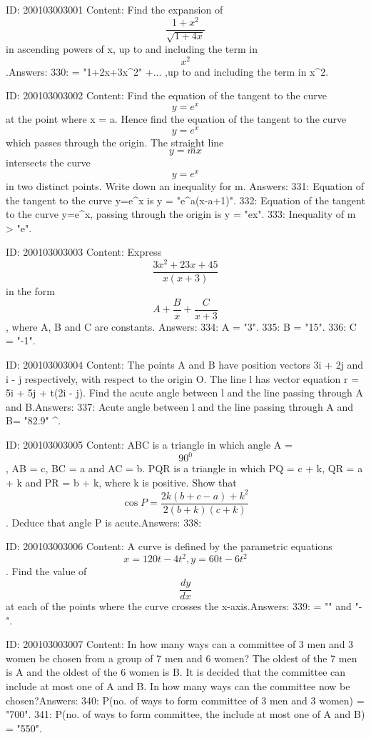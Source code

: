 \documentclass{article}
\begin{document}
ID: 200103003001
Content:
Find the expansion of  $$\frac{1 + x^2 }{\sqrt {1 + 4x}}$$ in ascending powers of x, up to and including the term in  $$x^2 $$.Answers:
330:  = "1+2x+3x^2" +... ,up to and including the term in x^2.

ID: 200103003002
Content:
Find the equation of the tangent to the curve  $$y = e^x $$ at the point where x = a. Hence find the equation of the tangent to the curve  $$y = e^x $$ which passes through the origin. The straight line $$y = mx$$ intersects the curve  $$y = e^x $$ in two distinct points. Write down an inequality for m. Answers:
331: Equation of the tangent to the curve y=e^{x} is y = "e^{a}(x-a+1)".
332: Equation of the tangent to the curve y=e^{x}, passing through the origin is y = "ex".
333: Inequality of m > "e".

ID: 200103003003
Content:
Express  $$\frac{3x^2  + 23x + 45}{x( x + 3 )}$$ in the form  $$A + \frac{B}{x} + \frac{C}{x + 3}$$, where A, B and C are constants. Answers:
334: A = "3".
335: B = "15".
336: C = "-1".

ID: 200103003004
Content:
The points A and B have position vectors 3i + 2j and i - j respectively, with respect to the origin O. The line l has vector equation r = 5i + 5j + t(2i - j). Find the acute angle between l and the line passing through A and B.Answers:
337: Acute angle between l and the line passing through A and B= "82.9" ^{\circ}.

ID: 200103003005
Content:
ABC is a triangle in which angle A =  $$90^0 $$, AB = c, BC = a and AC = b. PQR is a triangle in which PQ = c + k, QR = a + k and PR = b + k, where k is positive. Show that  $$\cos P = \frac{2k( b + c - a ) + k^2}{2( b + k )( c + k )}$$. Deduce that angle P is acute.Answers:
338: 

ID: 200103003006
Content:
A curve is defined by the parametric equations \[x = 120t - 4t^2, y = 60t - 6t^2\]. Find the value of  \[\frac{dy}{dx}\] at each of the points where the curve crosses the x-axis.Answers:
339:  = "" and "-".

ID: 200103003007
Content:
In how many ways can a committee of 3 men and 3 women be chosen from a group of 7 men and 6 women? The oldest of the 7 men is A and the oldest of the 6 women is B. It is decided that the committee can include at most one of A and B. In how many ways can the committee now be chosen?Answers:
340: P(no. of ways to form committee of 3 men and 3 women) = "700".
341: P(no. of ways to form committee, the include at most one of A and B) = "550".
\end{document}
